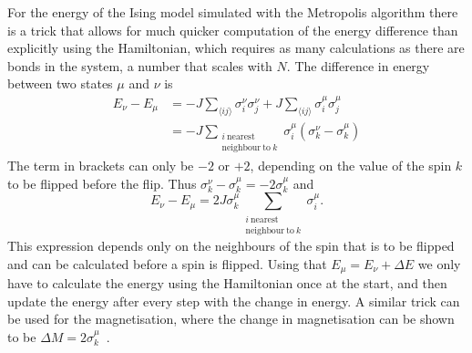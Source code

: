 \documentclass[11pt, a4paper]{report} %
\begin{document}
For the energy of the Ising model simulated with the Metropolis algorithm there is a trick that allows for much quicker computation of the energy difference than explicitly using the Hamiltonian, which requires as many calculations as there are bonds in the system, a number that scales with \(N\).
The difference in energy between two states \(\mu\) and \(\nu\) is
\begin{align}
	E_{\nu} - E_{\mu} &= -J \sum_{\langle ij \rangle} \sigma_i^{\nu} \sigma_j^{\nu} + J \sum_{\langle ij \rangle} \sigma_i^{\mu} \sigma_j^{\mu}\\
	&= -J \sum_{\substack{i\ \mathrm{nearest}\\ \mathrm{neighbour\ to}\ k}} \sigma_i^{\mu}\left(\sigma_k^{\nu} - \sigma_k^{\mu}\right)
\end{align}
The term in brackets can only be \(-2\) or \(+2\), depending on the value of the spin \(k\) to be flipped before the flip.
Thus \(\sigma_k^{\nu} - \sigma_k^{\mu} = -2 \sigma_k^{\mu}\) and
\begin{equation}
	E_{\nu} - E_{\mu} = 2 J \sigma_k^{\mu} \sum_{\substack{i\ \mathrm{nearest}\\ \mathrm{neighbour\ to}\ k}} \sigma_i^{\mu}.
\end{equation}
This expression depends only on the neighbours of the spin that is to be flipped and can be calculated before a spin is flipped.
Using that \(E_{\mu} = E_{\nu} + \Delta E\) we only have to calculate the energy using the Hamiltonian once at the start, and then update the energy after every step with the change in energy.
A similar trick can be used for the magnetisation, where the change in magnetisation can be shown to be \(\Delta M = 2\sigma_k^{\mu}\)~\cite{newman:1999}.
\end{document}
